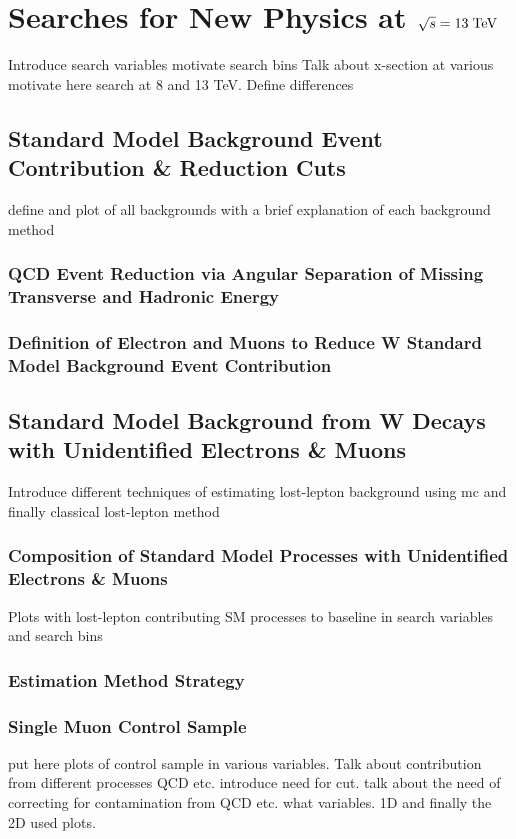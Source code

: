 \chapter{Searches for New Physics at $\sqrt{s}=13 \;\text{Te}\kern-0.06667em\text{V}$}
\label{sec:SUSY_Search_Intro}
\todo Introduce search variables motivate search bins
\todo Talk about x-section at various \CM motivate here search at 8 and 13 TeV. Define differences

\section{Standard Model Background Event Contribution \& Reduction Cuts}
\label{sec:SM_BackGrounds}
\todo define and plot of all backgrounds with a brief explanation of each background method
\subsection{QCD Event Reduction via Angular Separation of Missing Transverse and Hadronic Energy}

\subsection{Definition of Electron and Muons to Reduce W Standard Model Background Event Contribution}
\label{sec:Lepton_Definition_Study}

\section{Standard Model Background from W Decays with Unidentified Electrons \& Muons}
\label{sec:Lost_Lepton_8TeV_Main}
\todo Introduce different techniques of estimating lost-lepton background using mc and finally classical lost-lepton method
\subsection{Composition of Standard Model Processes with Unidentified Electrons \& Muons}
\label{sec:Lost_Lepton_8TeV_Composition}
\todo Plots with lost-lepton contributing SM processes to baseline in search variables and search bins

\subsection{Estimation Method Strategy}
\label{sec:Lost_Lepton_8TeV_Method_Strategy}

\subsection{Single Muon Control Sample}
\label{sec:Lost_Lepton_8TeV_CS}
\todo put here plots of control sample in various variables. Talk about contribution from different processes QCD etc. introduce need for \mt cut.
talk about the need of correcting for contamination from QCD etc. what variables. 1D and finally the 2D used plots.
